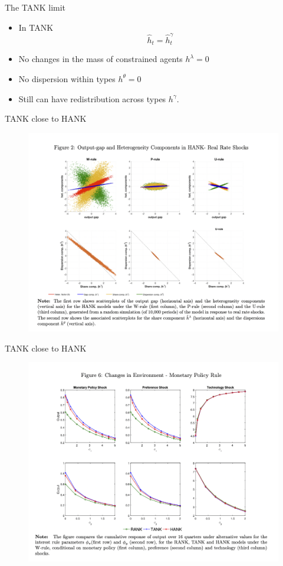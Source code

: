 \documentclass[english,xcolor=svgnames]{beamer}
\begin{document}
\begin{frame}{The TANK limit}
\begin{itemize}
\item In TANK
\[\hat{h}_t = \hat{h}^{\gamma}_t \]
\item No changes in the mass of constrained agents $h^{\lambda} = 0$
\item No dispersion within types $h^{\theta} = 0$
\item Still can have redistribution across types $h^{\gamma}$.
\end{itemize}
\end{frame}

\begin{frame}{TANK close to HANK}
\begin{figure}
\includegraphics[scale=0.3]{figures/dg_1}
\end{figure}
\end{frame}


\begin{frame}{TANK close to HANK}
\begin{figure}
\includegraphics[scale=0.3]{figures/dg_2}
\end{figure}
\end{frame}
\end{document}
